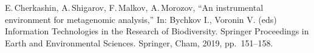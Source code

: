 \documentclass[conference]{IEEEtran}
\begin{document}
\begin{thebibliography}{99}
 E.\,Cherkashin, A.\,Shigarov, F.\,Malkov, A.\,Morozov, ``An instrumental environment for metagenomic analysis,'' In: Bychkov I., Voronin V. (eds) Information Technologies in the Research of Biodiversity. Springer Proceedings in Earth and Environmental Sciences. Springer, Cham, 2019, pp.~151--158.


\end{thebibliography}
\end{document}
